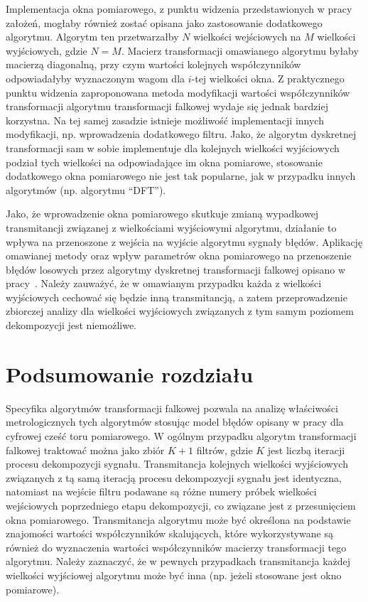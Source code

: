 Implementacja okna pomiarowego, z punktu widzenia przedstawionych w pracy założeń, mogłaby również zostać opisana jako zastosowanie dodatkowego algorytmu. Algorytm ten przetwarzałby $N$ wielkości wejściowych na $M$ wielkości wyjściowych, gdzie $N = M$. Macierz transformacji omawianego algorytmu byłaby macierzą diagonalną, przy czym wartości kolejnych współczynników odpowiadałyby wyznaczonym wagom dla $i$-tej wielkości okna. Z praktycznego punktu widzenia zaproponowana metoda modyfikacji wartości współczynników transformacji algorytmu transformacji falkowej wydaje się jednak bardziej korzystna. Na tej samej zasadzie istnieje możliwość implementacji innych modyfikacji, np. wprowadzenia dodatkowego filtru. Jako, że algorytm dyskretnej transformacji sam w sobie implementuje dla kolejnych wielkości wyjściowych podział tych wielkości na odpowiadające im okna pomiarowe, stosowanie dodatkowego okna pomiarowego nie jest tak popularne, jak w przypadku innych algorytmów (np. algorytmu \enquote{DFT}).

Jako, że wprowadzenie okna pomiarowego skutkuje zmianą wypadkowej transmitancji związanej z wielkościami wyjściowymi algorytmu, działanie to wpływa na przenoszone z wejścia na wyjście algorytmu sygnały błędów. Aplikację omawianej metody oraz wpływ parametrów okna pomiarowego na przenoszenie błędów losowych przez algorytmy dyskretnej transformacji falkowej opisano w pracy~\cite{auth_window}. Należy zauważyć, że w omawianym przypadku każda z wielkości wyjściowych cechować się będzie inną transmitancją, a zatem przeprowadzenie zbiorczej analizy dla wielkości wyjściowych związanych z tym samym poziomem dekompozycji jest niemożliwe.

\section{Podsumowanie rozdziału}

Specyfika algorytmów transformacji falkowej pozwala na analizę właściwości metrologicznych tych algorytmów stosując model błędów opisany w pracy dla cyfrowej cześć toru pomiarowego. W ogólnym przypadku algorytm transformacji falkowej traktować można jako zbiór $K+1$ filtrów, gdzie $K$ jest liczbą iteracji procesu dekompozycji sygnału. Transmitancja kolejnych wielkości wyjściowych związanych z tą samą iteracją procesu dekompozycji sygnału jest identyczna, natomiast na wejście filtru podawane są różne numery próbek wielkości wejściowych poprzedniego etapu dekompozycji, co związane jest z przesunięciem okna pomiarowego. Transmitancja algorytmu może być określona na podstawie znajomości wartości współczynników skalujących, które wykorzystywane są również do wyznaczenia wartości współczynników macierzy transformacji tego algorytmu. Należy zaznaczyć, że w pewnych przypadkach transmitancja każdej wielkości wyjściowej algorytmu może być inna (np. jeżeli stosowane jest okno pomiarowe).

